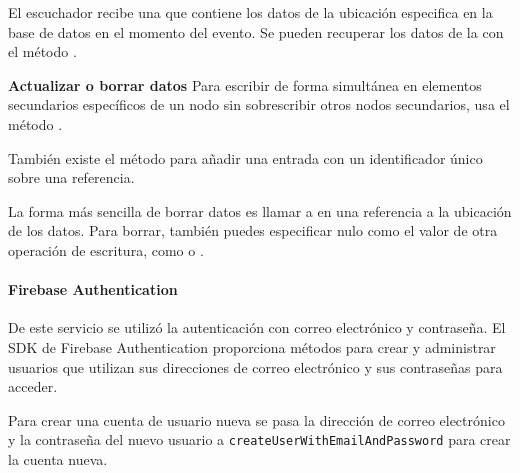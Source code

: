 El escuchador recibe una  que contiene los datos de la ubicación
especifica en la base de datos en el momento del evento. Se pueden recuperar
los datos de la  con el método .


\textbf{Actualizar o borrar datos}
\label{\detokenize{firebase_web:actualizar-o-borrar-datos}}
Para escribir de forma simultánea en elementos secundarios específicos de un
nodo sin sobrescribir otros nodos secundarios, usa el método .

También existe el método  para añadir una entrada con un identificador
único sobre una referencia.

La forma más sencilla de borrar datos es llamar a  en una referencia a
la ubicación de los datos. Para borrar, también puedes especificar nulo como
el valor de otra operación de escritura, como  o .


\paragraph{Firebase Authentication}

De este servicio se utilizó la autenticación con
correo electrónico y contraseña.
El SDK de Firebase Authentication proporciona métodos para crear y administrar usuarios que utilizan sus direcciones de correo electrónico y sus contraseñas para acceder.

Para crear una cuenta de usuario nueva se pasa la dirección de correo electrónico y la contraseña del nuevo usuario a \texttt{createUserWithEmailAndPassword} para crear la cuenta nueva.

%
\begin{sphinxVerbatim}[commandchars=\\\{\}]
  
        
     
     
\end{sphinxVerbatim}


